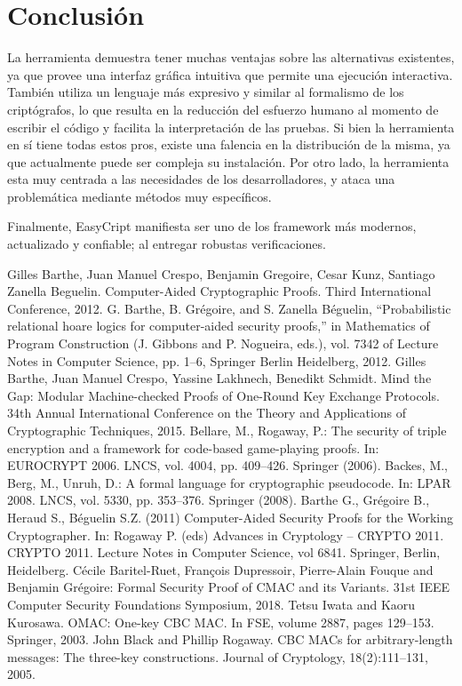 \documentclass[runningheads]{llncs}
\begin{document}
\section{Conclusión}

La herramienta demuestra tener muchas ventajas sobre las alternativas existentes, ya que provee una interfaz gráfica intuitiva que permite una ejecución interactiva. También utiliza un lenguaje más expresivo y similar al formalismo de los criptógrafos, lo que resulta en la reducción del esfuerzo humano al momento de escribir el código y facilita la interpretación de las pruebas. Si bien la herramienta en sí tiene todas estos pros, existe una falencia en la distribución de la misma, ya que actualmente puede ser compleja su instalación. Por otro lado, la herramienta esta muy centrada a las necesidades de los desarrolladores, y ataca una problemática mediante métodos muy específicos.

Finalmente, EasyCript manifiesta ser uno de los framework más modernos, actualizado y confiable; al entregar robustas verificaciones.

\begin{thebibliography}{8}
Gilles Barthe, Juan Manuel Crespo, Benjamin Gregoire, Cesar Kunz, Santiago Zanella Beguelin. Computer-Aided Cryptographic Proofs. Third International Conference, 2012.
G. Barthe, B. Grégoire, and S. Zanella Béguelin, “Probabilistic relational hoare
logics for computer-aided security proofs,” in Mathematics of Program Construction
(J. Gibbons and P. Nogueira, eds.), vol. 7342 of Lecture Notes in
Computer Science, pp. 1–6, Springer Berlin Heidelberg, 2012.
Gilles Barthe, Juan Manuel Crespo, Yassine Lakhnech, Benedikt Schmidt. Mind the Gap: Modular Machine-checked Proofs of One-Round Key Exchange Protocols. 34th Annual International Conference on the Theory and Applications of Cryptographic Techniques, 2015.
Bellare, M., Rogaway, P.: The security of triple encryption and a framework for
code-based game-playing proofs. In: EUROCRYPT 2006. LNCS, vol. 4004, pp.
409–426. Springer (2006).
Backes, M., Berg, M., Unruh, D.: A formal language for cryptographic pseudocode.
In: LPAR 2008. LNCS, vol. 5330, pp. 353–376. Springer (2008).
Barthe G., Grégoire B., Heraud S., Béguelin S.Z. (2011) Computer-Aided Security Proofs for the Working Cryptographer. In: Rogaway P. (eds) Advances in Cryptology – CRYPTO 2011. CRYPTO 2011. Lecture Notes in Computer Science, vol 6841. Springer, Berlin, Heidelberg.
Cécile Baritel-Ruet, François Dupressoir, Pierre-Alain Fouque and Benjamin Grégoire: Formal Security Proof of CMAC and its Variants.
31st IEEE Computer Security Foundations Symposium, 2018.
Tetsu Iwata and Kaoru Kurosawa. OMAC: One-key CBC MAC. In FSE, volume 2887, pages 129–153. Springer, 2003.
John Black and Phillip Rogaway. CBC MACs for arbitrary-length messages: The three-key constructions. Journal of Cryptology, 18(2):111–131, 2005.

\end{thebibliography}
\end{document}
